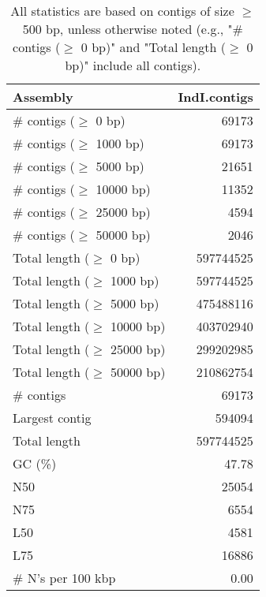 \documentclass[12pt,a4paper]{article}
\begin{document}
\begin{table}[ht]
\begin{center}
\caption{All statistics are based on contigs of size $\geq$ 500 bp, unless otherwise noted (e.g., "\# contigs ($\geq$ 0 bp)" and "Total length ($\geq$ 0 bp)" include all contigs).}
\begin{tabular}{|l*{1}{|r}|}
\hline
Assembly & IndI.contigs \\ \hline
\# contigs ($\geq$ 0 bp) & 69173 \\ \hline
\# contigs ($\geq$ 1000 bp) & 69173 \\ \hline
\# contigs ($\geq$ 5000 bp) & 21651 \\ \hline
\# contigs ($\geq$ 10000 bp) & 11352 \\ \hline
\# contigs ($\geq$ 25000 bp) & 4594 \\ \hline
\# contigs ($\geq$ 50000 bp) & 2046 \\ \hline
Total length ($\geq$ 0 bp) & 597744525 \\ \hline
Total length ($\geq$ 1000 bp) & 597744525 \\ \hline
Total length ($\geq$ 5000 bp) & 475488116 \\ \hline
Total length ($\geq$ 10000 bp) & 403702940 \\ \hline
Total length ($\geq$ 25000 bp) & 299202985 \\ \hline
Total length ($\geq$ 50000 bp) & 210862754 \\ \hline
\# contigs & 69173 \\ \hline
Largest contig & 594094 \\ \hline
Total length & 597744525 \\ \hline
GC (\%) & 47.78 \\ \hline
N50 & 25054 \\ \hline
N75 & 6554 \\ \hline
L50 & 4581 \\ \hline
L75 & 16886 \\ \hline
\# N's per 100 kbp & 0.00 \\ \hline
\end{tabular}
\end{center}
\end{table}
\end{document}

